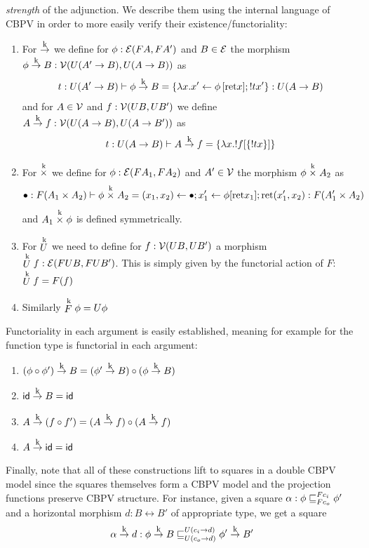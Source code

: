 \emph{strength} of the adjunction. We describe them using the internal
language of CBPV in order to more easily verify their
existence/functoriality:
\begin{enumerate}
\item For $\tok$ we define for $\phi : \calE(F A,F A')$ and $B \in \calE$ the morphism $\phi \tok B : \calV(U(A' \to B),U(A\to B))$ as
  \[ t:U(A'\to B) \vdash \phi \tok B = \{ \lambda x. x' \leftarrow \phi\,[\ret x]; ! t x'\} : U(A \to B) \]
  and for $A \in \calV$ and $f : \calV(UB,UB')$ we define $A \tok f : \calV(U(A \to B),U(A\to B'))$ as
  \[ t : U(A \to B) \vdash A \tok f = \{ \lambda x. !f[\{ ! t x \}]\} \]
\item For $\timesk$ we define for $\phi : \calE(F A_1,FA_2)$ and $A' \in \calV$ the morphism $\phi \timesk A_2$ as
  \[ \bullet : F(A_1\times A_2) \vdash \phi \timesk A_2 = (x_1,x_2) \leftarrow \bullet; x_1' \leftarrow \phi[\ret x_1]; \ret (x_1',x_2) : F(A_1'\times A_2)\]
  and $A_1 \timesk \phi$ is defined symmetrically.
\item For $\Uk$ we need to define for $f : \calV(UB,UB')$ a morphism $\Uk f : \calE(FUB,FUB')$. This is simply given by the functorial action of $F$: $\Uk f = F(f)$
\item Similarly $\Fk \phi = U\phi$
\end{enumerate}

Functoriality in each argument is easily established, meaning for
example for the function type is functorial in each argument:
\begin{enumerate}
\item $(\phi \circ \phi') \tok B = (\phi' \tok B) \circ (\phi \tok B)$
\item $\id \tok B = \id$
\item $A \tok (f \circ f') = (A \tok f) \circ (A \tok f)$
\item $A \tok \id = \id$
\end{enumerate}

Finally, note that all of these constructions lift to squares in a
double CBPV model since the squares themselves form a CBPV model and
the projection functions preserve CBPV structure. For instance, given a square
$\alpha : \phi \ltdyn_{F c_o}^{F c_i} \phi'$ and a horizontal morphism $d : B \rel B'$ of appropriate type, we get a square
\[ \alpha \tok d : \phi \tok B \ltdyn_{U(c_o \to d)}^{U(c_i \to d)} \phi' \tok B' \]